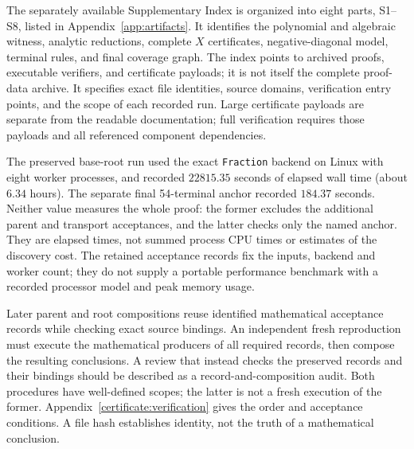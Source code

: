 \documentclass[11pt,reqno]{amsart}
\theoremstyle{definition}
\theoremstyle{remark}
\begin{document}
The separately available Supplementary Index is organized into eight
parts, S1--S8, listed in Appendix~\ref{app:artifacts}. It identifies the polynomial
and algebraic witness, analytic reductions, complete \(X\) certificates,
negative-diagonal model, terminal rules, and final coverage graph.
The index points to archived proofs, executable verifiers, and certificate
payloads; it is not itself the complete proof-data archive.
It specifies exact file
identities, source domains, verification entry points, and the scope
of each recorded run. Large certificate payloads are separate from
the readable documentation; full verification requires those payloads
and all referenced component dependencies.

The preserved base-root run used the exact \texttt{Fraction} backend on
Linux with eight worker processes, and recorded \(22815.35\) seconds
of elapsed wall time (about \(6.34\) hours). The separate final
54-terminal anchor recorded \(184.37\) seconds. Neither value measures
the whole proof: the former excludes the additional parent and
transport acceptances, and the latter checks only the named anchor.
They are elapsed times, not summed process CPU times or estimates of
the discovery cost. The retained acceptance records fix the inputs,
backend and worker count; they do not supply a portable performance
benchmark with a recorded processor model and peak memory usage.

Later parent and root compositions reuse identified mathematical
acceptance records while checking exact source bindings. An independent
fresh reproduction must execute the mathematical producers of all
required records, then compose the resulting conclusions. A review
that instead checks the preserved records and their bindings should
be described as a record-and-composition audit. Both procedures have
well-defined scopes; the latter is not a fresh execution of the former.
Appendix~\ref{certificate:verification} gives the order and acceptance
conditions. A file hash establishes identity, not the truth of a
mathematical conclusion.
\end{document}
